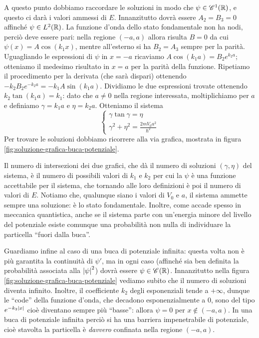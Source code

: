 A questo punto dobbiamo raccordare le soluzioni in modo che $\psi\in\mathscr{C}^{{1}}(\mathbb{R})$, e questo ci darà i valori ammessi di $E$.
Innanzitutto dovrà essere $A_2=B_3=0$ affinch\'e $\psi\in L^2(\mathbb{R})$.
La funzione d'onda dello stato fondamentale non ha nodi, perciò deve essere pari: nella regione $(-a,a)$ allora risulta $B=0$ da cui $\psi(x)=A\cos(k_1x)$, mentre all'esterno si ha $B_2=A_3$ sempre per la parità.
Uguagliando le espressioni di $\psi$ in $x=-a$ ricaviamo $A\cos(k_1a)=B_2e^{k_2a}$; otteniamo il medesimo risultato in $x=a$ per la parità della funzione.
Ripetiamo il procedimento per la derivata (che sarà dispari) ottenendo $-k_2B_2e^{-k_2a}=-k_1A\sin(k_1a)$.
Dividiamo le due espressioni trovate ottenendo $k_2\tan(k_1a)=k_1$: dato che $a\ne 0$ nella regione interessata, moltiplichiamo per $a$ e definiamo $\gamma=k_1a$ e $\eta=k_2a$.
Otteniamo il sistema
\begin{equation}
	\begin{cases}
		\gamma\tan\gamma=\eta\\
		\gamma^2+\eta^2=\frac{2mV_0a^2}{\hbar^2}
	\end{cases}
	\label{eq:sistema-soluzioni-buca-potenziale-finita}
\end{equation}
Per trovare le soluzioni dobbiamo ricorrere alla via grafica, mostrata in figura \ref{fig:soluzione-grafica-buca-potenziale}.

Il numero di intersezioni dei due grafici, che dà il numero di soluzioni $(\gamma,\eta)$ del sistema, è il numero di possibili valori di $k_1$ e $k_2$ per cui la $\psi$ è una funzione accettabile per il sistema, che tornando alle loro definizioni è poi il numero di valori di $E$.
Notiamo che, qualunque siano i valori di $V_0$ e $a$, il sistema ammette sempre una soluzione: è lo stato fondamentale.
Inoltre, come accade spesso in meccanica quantistica, anche se il sistema parte con un'energia minore del livello del potenziale esiste comunque una probabilità non nulla di individuare la particella ``fuori dalla buca''.

Guardiamo infine al caso di una buca di potenziale infinita: questa volta non è più garantita la continuità di $\psi'$, ma in ogni caso (affinch\'e sia ben definita la probabilità associata alla $\left|{\psi}\right|^2$) dovrà essere $\psi\in\mathscr{C}^{{}}(\mathbb{R})$.
Innanzitutto nella figura \ref{fig:soluzione-grafica-buca-potenziale} vediamo subito che il numero di soluzioni diventa infinito.
Inoltre, il coefficiente $k_2$ degli esponenziali tende a $+\infty$, dunque le ``code'' della funzione d'onda, che decadono esponenzialmente a 0, sono del tipo $e^{-k_2\left|{x}\right|}$ cioè diventano sempre più ``basse'': allora $\psi=0$ per $x\notin(-a,a)$.
In una buca di potenziale infinita perciò si ha una barriera impenetrabile di potenziale, cioè stavolta la particella è \emph{davvero} confinata nella regione $(-a,a)$.

